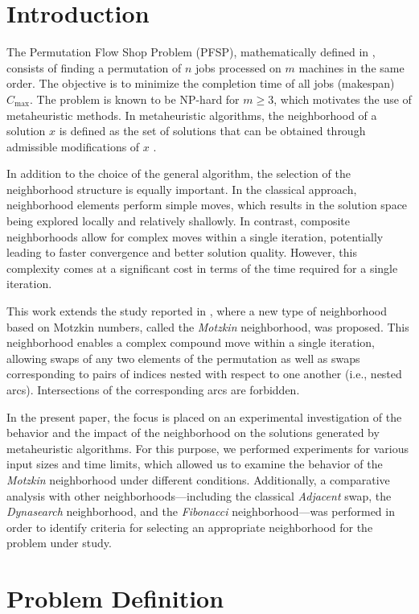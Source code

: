 \documentclass[runningheads]{llncs}
\begin{document}
\section{Introduction}
The Permutation Flow Shop Problem (PFSP), mathematically defined in \cite{ref_bozejko_parallel}, consists of finding a permutation of $n$ jobs processed on $m$ machines in the same order. The objective is to minimize the completion time of all jobs (makespan) $C_{\max}$. The problem is known to be NP-hard for $m \ge 3$, which motivates the use of metaheuristic methods. In metaheuristic algorithms, the neighborhood of a solution $x$ is defined as the set of solutions that can be obtained through admissible modifications of $x$ \cite{vanlaarhoven1992}.

In addition to the choice of the general algorithm, the selection of the neighborhood structure is equally important. In the classical approach, neighborhood elements perform simple moves, which results in the solution space being explored locally and relatively shallowly. In contrast, composite neighborhoods allow for complex moves within a single iteration, potentially leading to faster convergence and better solution quality. However, this complexity comes at a significant cost in terms of the time required for a single iteration.

This work extends the study reported in \cite{Motzkin_PWR}, where a new type of neighborhood based on Motzkin numbers, called the \emph{Motzkin} neighborhood, was proposed. This neighborhood enables a complex compound move within a single iteration, allowing swaps of any two elements of the permutation as well as swaps corresponding to pairs of indices nested with respect to one another (i.e., nested arcs). Intersections of the corresponding arcs are forbidden.

In the present paper, the focus is placed on an experimental investigation of the behavior and the impact of the neighborhood on the solutions generated by metaheuristic algorithms. For this purpose, we performed experiments for various input sizes and time limits, which allowed us to examine the behavior of the \emph{Motzkin} neighborhood under different conditions. Additionally, a comparative analysis with other neighborhoods---including the classical \emph{Adjacent} swap, the \emph{Dynasearch} neighborhood, and the \emph{Fibonacci} neighborhood---was performed in order to identify criteria for selecting an appropriate neighborhood for the problem under study.

\section{Problem Definition}
\end{document}
